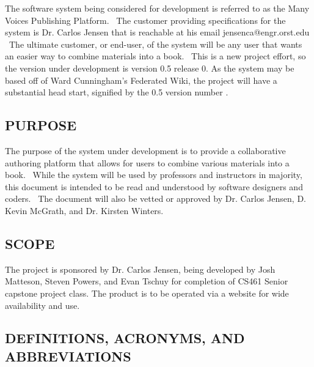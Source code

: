 \documentclass[letterpaper, 10pt, draftclsnofoot, compsoc, onecolumn]{IEEEtran}
\begin{document}
{\noindent
The software system being considered for development is referred to as the Many Voices
Publishing Platform. \ The customer providing specifications
for the system is Dr. Carlos Jensen that is reachable at his email jensenca@engr.orst.edu \
The ultimate customer, or end-user, of the system will be any user that wants an easier
way to combine materials into a book. \ This is a new project effort, so the
version under development is version 0.5 release 0. As the system may be based off of Ward Cunningham's 
Federated Wiki, the project will have a substantial head start, signified by the 0.5 version number \cite{Federated}.}

\subsection[PURPOSE]{\rmfamily\bfseries\color{black} PURPOSE}

{\noindent 
The purpose of the system under
development is to provide a collaborative authoring platform that allows for users to
combine various materials into a book. \ While the system will be used by professors and
instructors in majority, this document is intended to be read and understood by software
designers and coders. \ The document will also be vetted or
approved by Dr. Carlos Jensen, D. Kevin McGrath, and Dr. Kirsten Winters.}

\subsection[SCOPE]{\rmfamily\bfseries\color{black} SCOPE}

{\noindent 
The project is sponsored by Dr. Carlos Jensen, being developed by Josh Matteson,
Steven Powers, and Evan Tschuy for completion of CS461 Senior capstone project class.
The product is to be operated via a website for wide availability and use.}

\subsection[DEFINITIONS, ACRONYMS, AND ABBREVIATIONS]{\rmfamily\bfseries\color{black} DEFINITIONS, ACRONYMS, AND ABBREVIATIONS}

\bigskip
\end{document}
